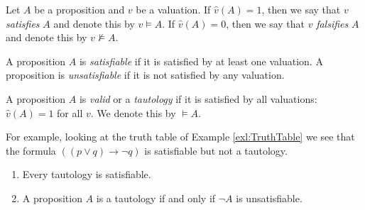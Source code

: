 \begin{page}

\begin{dfn}
Let $A$ be a proposition and $v$ be a valuation.
If $\hat{v}(A) = 1$, then we say that $v$ \emph{satisfies} $A$ and denote this by $v \vDash A$.
If $\hat{v}(A) = 0$, then we say that $v$ \emph{falsifies} $A$ and denote this by $v \nvDash A$.
\end{dfn}

\end{page}

\begin{page}

\begin{dfn}
A proposition $A$ is \emph{satisfiable} if it is satisfied by at least one valuation.
A proposition is \emph{unsatisfiable} if it is not satisfied by any valuation.

A proposition $A$ is \emph{valid} or a \emph{tautology} if it is satisfied by all valuations: $\hat{v}(A) = 1$ for all $v$.
We denote this by $\vDash A$.
\end{dfn}

\end{page}

\begin{page}


For example, looking at the truth table of Example \ref{exl:TruthTable} we see that the formula $((p \vee q) \to \neg q)$ is satisfiable but not a tautology.


\end{page}

\begin{page}

\begin{thm}
\begin{enumerate}
\item
Every tautology is satisfiable.
\item
A proposition $A$ is a tautology if and only if $\neg A$ is unsatisfiable.
\end{enumerate}
\end{thm}

\end{page}

